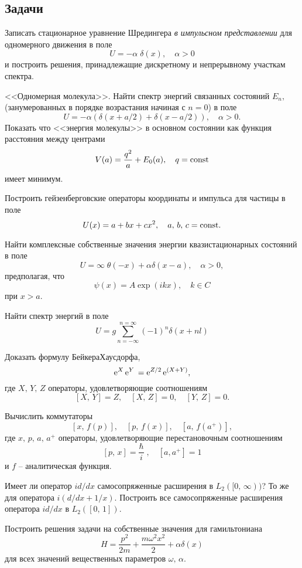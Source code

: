 \documentclass[a4paper,draft]{article}
\begin{document}
\subsection{Задачи}

\begin{nums}{-2}
\item
Записать стационарное уравнение Шредингера {\em в импульсном
представлении} для одномерного движения в поле
$$
U=-\alpha \;\delta(x),\quad \alpha>0
$$
и построить решения, принадлежащие дискретному и непрерывному
участкам спектра.

\item
<<Одномерная молекула>>. Найти спектр энергий связанных
состояний $E_n,$ (занумерованных в порядке возрастания начиная
с $n=0$) в поле
$$
U=-\alpha (\delta(x+a/2) + \delta(x-a/2)),\quad \alpha>0.
$$
Показать что <<энергия молекулы>> в основном состоянии как
функция расстояния между центрами
$$
V(a)=\frac{q^2}{a}+E_0(a),\quad q={\rm const}
$$
имеет минимум.


\item
Построить гейзенберговские операторы координаты и импульса для
частицы в поле
$$
U(x)=a+bx+cx^2,\quad a,\,b,\,c={\rm const}.
$$

\item
Найти комплексные собственные значения энергии квазистационарных
состояний в поле
$$
U=\infty \; \theta(-x) + \alpha\delta(x-a),\quad \alpha>0,
$$
предполагая, что
$$
\psi(x)=A\exp(ikx),\quad k\in C
$$
при $x>a$.

\item
Найти спектр энергий в поле
$$ U=g\sum_{n=-\infty}^{n=\infty}(-1)^n\delta(x+nl)
$$
\item
Доказать формулу Бейкера\ч Хаусдорфа,
$$
{\rm e}^X\,{\rm e}^Y\,={\rm e}^{Z/2}\,{\rm e}^{(X+Y)},
$$
где $X,\,Y,\,Z$ операторы, удовлетворяющие соотношениям
$$
 [X,\,Y]=Z,\quad [X,\,Z]= 0,\quad [Y,\,Z]=0.
$$

\item
Вычислить коммутаторы
$$
[x,\,f(p)],\quad [p,\,f(x)],\quad [a,\,f(a^+)],
$$
где $x,\,p,\,a,\,a^+$ операторы, удовлетворяющие перестановочным
соотношениям
$$
[p,\,x]=\frac{\hbar}{i}\;,\quad [a,a^+]=1
$$
и $f$ -- аналитическая функция.
\item
Имеет ли оператор $id/dx$ самосопряженные расширения в
$L_2([0,\,\infty))$? То же для оператора $i(d/dx+1/x)$.
Построить все самосопряженные расширения оператора $id/dx$ в
$L_2([0,\,1])$.


\item
Построить решения задачи на собственные значения для
гамильтониана
 $$
H=\frac{p^2}{2m}+\frac{m \omega^2 x^2}{2}+\alpha \delta(x)
 $$
для всех значений вещественных параметров $\omega,\, \alpha$.


\end{nums}
\end{document}
